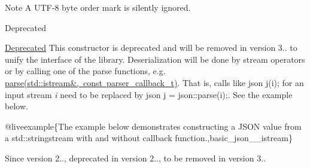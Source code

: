 \begin{DoxyNote}{Note}
A U\+T\+F-\/8 byte order mark is silently ignored.
\end{DoxyNote}
\begin{DoxyRefDesc}{Deprecated}
\item[\mbox{\hyperlink{deprecated__deprecated000001}{Deprecated}}]This constructor is deprecated and will be removed in version 3.. to unify the interface of the library. Deserialization will be done by stream operators or by calling one of the {\ttfamily parse} functions, e.\+g. \mbox{\hyperlink{classnlohmann_1_1basic__json_a4cd30efe5c33a7cf73a0c6495bb16054}{parse(std\+::istream\&, const parser\+\_\+callback\+\_\+t)}}. That is, calls like {\ttfamily json j(i);} for an input stream {\itshape i} need to be replaced by {\ttfamily json j = json\+::parse(i);}. See the example below.\end{DoxyRefDesc}


@liveexample\{The example below demonstrates constructing a J\+S\+ON value from a {\ttfamily std\+::stringstream} with and without callback function.,basic\+\_\+json\+\_\+\+\_\+istream\}

\begin{DoxySince}{Since}
version 2.., deprecated in version 2.., to be removed in version 3.. 
\end{DoxySince}
\mbox{\label{classnlohmann_1_1basic__json_af5de621bcf646c332343f9c1e011126c}} 
